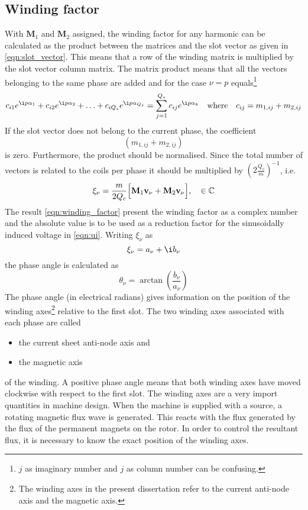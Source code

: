 \subsection{Winding factor}
With $\mathbf{M}_1$ and $\mathbf{M}_2$ assigned, the winding factor for any harmonic can be calculated as the product between the matrices and the slot vector as given in \eqref{eqn:slot_vector}. This means that a row of the winding matrix is multiplied by the slot vector column matrix. The matrix product means that all the vectors belonging to the same phase are added and for the case $\nu=p$ equals\footnote{$j$ as imaginary number and $j$ as column number can be confusing.}
\begin{equation}
  \label{eqn:m1_m2_exp}
  c_{i1}e^{\i p\alpha_1}+c_{i2}e^{\i p\alpha_2}+\ldots+
  c_{iQ_s}e^{\i p \alpha_{Q_s}} = \sum_{j=1}^{Q_s}c_{ij}e^{\i p\alpha_k}
  \quad \mbox{where} \quad
  c_{ij} = m_{1,ij}+m_{2,ij}
\end{equation}
If the slot vector does not belong to the current phase, the coefficient
\begin{equation} 
  \left(m_{1,ij}+m_{2,ij}\right)
\end{equation} 
is zero. Furthermore, the product should be normalised. Since the total number of vectors is related to the coils per phase it should be multiplied by $\left(2\frac{Q_c}{m}\right)^{-1}$, i.e.
\begin{equation}
  \label{eqn:winding_factor}
  \xi_{\nu} = \frac{m}{2Q_c}
  \Bigl[
    \mathbf{M}_1\mathbf{v_{\nu}}+\mathbf{M}_2\mathbf{v_{\nu}}
  \Bigr], 
  \quad \in \mathbb{C}
\end{equation}
The result \eqref{eqn:winding_factor} present the winding factor as a complex number and the absolute value is to be used as a reduction factor for the sinusoidally induced voltage in \eqref{eqn:ui}. Writing $\xi_{\nu}$ as
\begin{equation}
  \xi_{\nu} = a_{\nu}+\i b_{\nu}
\end{equation}
the phase angle is calculated as 
\begin{equation}
  \theta_{\nu} = \arctan\left(\frac{b_{\nu}}{a_{\nu}}\right)
\end{equation}
The phase angle (in electrical radians) gives information on the position of the winding axes\footnote{The winding axes in the present dissertation refer to the current anti-node axis and the magnetic axis.} relative to the first slot. The two winding axes associated with each phase are called
\begin{itemize}
  \item the current sheet anti-node axis and
  \item the magnetic axis
\end{itemize}
of the winding. A positive phase angle means that both winding axes have moved clockwise with respect to the first slot. The winding axes are a very import quantities in machine design. When the machine is supplied with a source, a rotating magnetic flux wave is generated. This reacts with the flux generated by the flux of the permanent magnets on the rotor. In order to control the resultant flux, it is necessary to know the exact position of the winding axes.  

